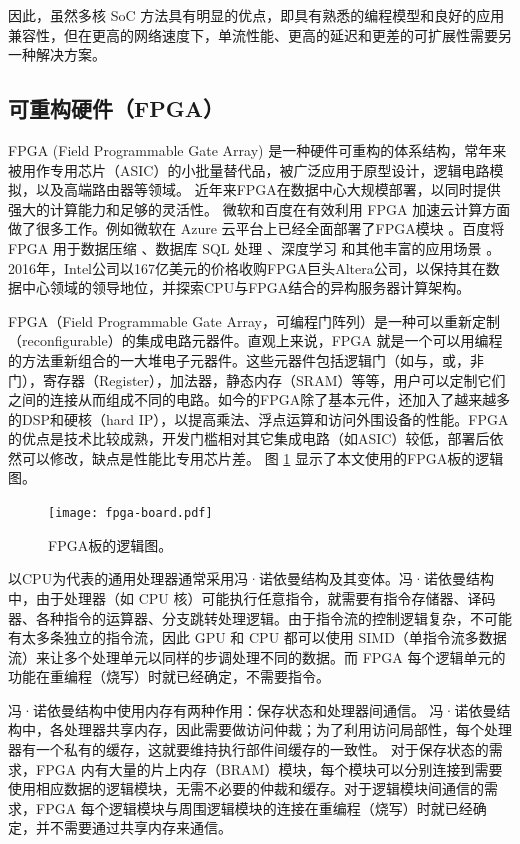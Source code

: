因此，虽然多核 SoC 方法具有明显的优点，即具有熟悉的编程模型和良好的应用兼容性，但在更高的网络速度下，单流性能、更高的延迟和更差的可扩展性需要另一种解决方案。


\subsection{可重构硬件（FPGA）}
\label{smartnic-fpga}

FPGA (Field Programmable Gate Array) 是一种硬件可重构的体系结构，常年来被用作专用芯片（ASIC）的小批量替代品，被广泛应用于原型设计，逻辑电路模拟，以及高端路由器等领域。
近年来FPGA在数据中心大规模部署，以同时提供强大的计算能力和足够的灵活性。
微软和百度在有效利用 FPGA 加速云计算方面做了很多工作。例如微软在 Azure 云平台上已经全面部署了FPGA模块 \cite{putnam2014reconfigurable,caulfield2016cloud}。百度将 FPGA 用于数据压缩 \cite{ouyang2010fpga}、数据库 SQL 处理 \cite{baidu-fpga-sql}、深度学习 \cite{ouyang2014sda} 和其他丰富的应用场景 \cite{ouyang2017xpu}。
2016年，Intel公司以167亿美元的价格收购FPGA巨头Altera公司，以保持其在数据中心领域的领导地位，并探索CPU与FPGA结合的异构服务器计算架构。


FPGA（Field Programmable Gate Array，可编程门阵列）是一种可以重新定制（reconfigurable）的集成电路元器件。直观上来说，FPGA 就是一个可以用编程的方法重新组合的一大堆电子元器件。这些元器件包括逻辑门（如与，或，非门），寄存器（Register），加法器，静态内存（SRAM）等等，用户可以定制它们之间的连接从而组成不同的电路。如今的FPGA除了基本元件，还加入了越来越多的DSP和硬核（hard IP），以提高乘法、浮点运算和访问外围设备的性能。FPGA的优点是技术比较成熟，开发门槛相对其它集成电路（如ASIC）较低，部署后依然可以修改，缺点是性能比专用芯片差。
图 \ref{clicknp:fig:fpga} 显示了本文使用的FPGA板的逻辑图。


\begin{figure}[htbp]
	\centering
	\texttt{[image: fpga-board.pdf]}
	\caption{FPGA板的逻辑图。}
	\label{clicknp:fig:fpga}
\end{figure}



以CPU为代表的通用处理器通常采用冯·诺依曼结构及其变体。冯·诺依曼结构中，由于处理器（如 CPU 核）可能执行任意指令，就需要有指令存储器、译码器、各种指令的运算器、分支跳转处理逻辑。由于指令流的控制逻辑复杂，不可能有太多条独立的指令流，因此 GPU 和 CPU 都可以使用 SIMD（单指令流多数据流）来让多个处理单元以同样的步调处理不同的数据。而 FPGA 每个逻辑单元的功能在重编程（烧写）时就已经确定，不需要指令。

冯·诺依曼结构中使用内存有两种作用：保存状态和处理器间通信。
冯·诺依曼结构中，各处理器共享内存，因此需要做访问仲裁；为了利用访问局部性，每个处理器有一个私有的缓存，这就要维持执行部件间缓存的一致性。
对于保存状态的需求，FPGA 内有大量的片上内存（BRAM）模块，每个模块可以分别连接到需要使用相应数据的逻辑模块，无需不必要的仲裁和缓存。对于逻辑模块间通信的需求，FPGA 每个逻辑模块与周围逻辑模块的连接在重编程（烧写）时就已经确定，并不需要通过共享内存来通信。

